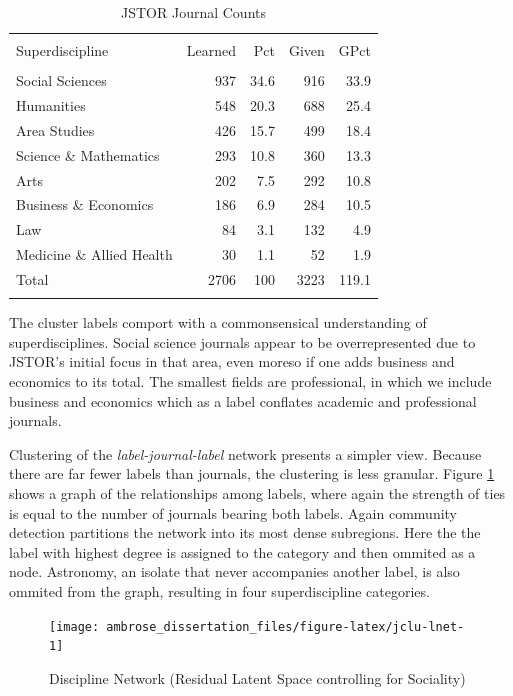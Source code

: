 \documentclass[]{book}
\begin{document}
\begin{table}[!htbp] \centering 
  \caption{JSTOR Journal Counts} 
  \label{tab:jclu-tab-sup} 
\begin{tabular}{@{\extracolsep{5pt}} lrrrr} 
\\[-1.8ex]\hline 
\hline \\[-1.8ex] 
Superdiscipline & Learned & Pct & Given & GPct \\ 
\hline \\[-1.8ex] 
Social Sciences & 937 & 34.6 & 916 & 33.9 \\ 
Humanities & 548 & 20.3 & 688 & 25.4 \\ 
Area Studies & 426 & 15.7 & 499 & 18.4 \\ 
Science \& Mathematics & 293 & 10.8 & 360 & 13.3 \\ 
Arts & 202 & 7.5 & 292 & 10.8 \\ 
Business \& Economics & 186 & 6.9 & 284 & 10.5 \\ 
Law & 84 & 3.1 & 132 & 4.9 \\ 
Medicine \& Allied Health & 30 & 1.1 & 52 & 1.9 \\ 
Total & 2706 & 100 & 3223 & 119.1 \\ 
\hline \\[-1.8ex] 
\end{tabular} 
\end{table}

The cluster labels comport with a commonsensical understanding of
superdisciplines. Social science journals appear to be overrepresented
due to JSTOR's initial focus in that area, even moreso if one adds
business and economics to its total. The smallest fields are
professional, in which we include business and economics which as a
label conflates academic and professional journals.

Clustering of the \emph{label-journal-label} network presents a simpler
view. Because there are far fewer labels than journals, the clustering
is less granular. Figure \ref{fig:jclu-lnet} shows a graph of the
relationships among labels, where again the strength of ties is equal to
the number of journals bearing both labels. Again community detection
partitions the network into its most dense subregions. Here the the
label with highest degree is assigned to the category and then ommited
as a node. Astronomy, an isolate that never accompanies another label,
is also ommited from the graph, resulting in four superdiscipline
categories.

\begin{figure}

{\centering \texttt{[image: ambrose\_dissertation\_files/figure-latex/jclu-lnet-1]} 

}

\caption{Discipline Network (Residual Latent Space controlling for Sociality)}\label{fig:jclu-lnet}
\end{figure}
\end{document}
